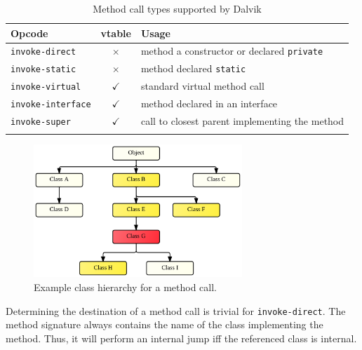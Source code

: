 \documentclass[12pt,twoside,notitlepage]{report}
\newcommand{\tick}{$\checkmark$}
\newcommand{\cross}{$\times$}
\begin{document}
\begin{table}[h]
	\begin{center}
	\begin{footnotesize}
	\begin{tabular}{|l|c|l|}
		\firsthline
		\textbf{Opcode}         & \footnotesize{\textbf{vtable}} & \textbf{Usage} \\
		\hline
		\verb$invoke-direct$    & \cross          & method a constructor or declared \verb$private$ \\
		\verb$invoke-static$    & \cross          & method declared \verb$static$ \\
		\hline
		\verb$invoke-virtual$   & \tick           & standard virtual method call \\
		\verb$invoke-interface$ & \tick           & method declared in an interface \\
		\verb$invoke-super$     & \tick           & call to closest parent implementing the method \\
		\lasthline
	\end{tabular}
	\end{footnotesize}
	\end{center}
	\caption{Method call types supported by Dalvik}
	\label{table:TaintPropagation_MethodCallTypes}
\end{table}

\begin{figure}[h]
	\centerline{	
		\includegraphics[width=0.7\textwidth]{figs/fig_virtual_call_tree.png}
	}
	\caption{Example class hierarchy for a method call.}
	\label{fig:TaintPropagation_DestDecision_ClassHierarchy}
\end{figure}

Determining the destination of a method call is trivial for \verb$invoke-direct$. The method signature always contains the name of the class implementing the method. Thus, it will perform an internal jump iff the referenced class is internal.
\end{document}
